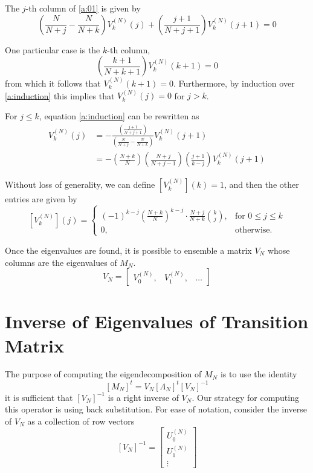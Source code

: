 \documentclass{article}
\newcommand{\ppar}[1]{\left( #1 \right)}
\newcommand{\spar}[1]{\left[ #1 \right]}
\begin{document}
The $j$-th column of \eqref{a:01} is given by
\begin{equation}
    \ppar{\frac{N}{N+j}-\frac{N}{N+k} } V_k^{(N)}(j) + \ppar{\frac{j+1}{N+j+1}}V_k^{(N)}(j+1) = 0
    \label{a:induction}
\end{equation}

One particular case is the $k$-th column,
\begin{equation}
    \ppar{\frac{k+1}{N+k+1}}V_k^{(N)}(k+1) = 0
\end{equation}
from which it follows that $V_k^{(N)}(k+1) = 0$. Furthermore, by induction over \eqref{a:induction} this implies that $V_k^{(N)}(j) = 0$ for $j>k$.

For $j\leq k$, equation \eqref{a:induction} can be rewritten as
\begin{align}
    V_k^{(N)}(j) 
    &= -
    \frac{\ppar{\frac{j+1}{N+j+1}}}{\ppar{\frac{N}{N+j}-\frac{N}{N+k} }}
    V_k^{(N)}(j+1)
    \nonumber \\
    &=
    -
    \ppar{\frac{N+k}{N}} \ppar{\frac{N+j}{N+j-1}} \ppar{\frac{j+1}{k-j}} V_k^{(N)}(j+1)
\end{align}

Without loss of generality, we can define $\spar{V_k^{(N)}}(k) = 1$, and then the other entries are given by
\begin{equation}
    \spar{V_k^{(N)}}(j) =
    \begin{cases}
    (-1)^{k-j} \ppar{\frac{N+k}{N}}^{k-j} \cdot \frac{N+j}{N+k} \binom{k}{j},
    &\text{for } 0 \leq j\leq k\\
    0, &\text{otherwise.}
    \end{cases}
\end{equation}

Once the eigenvalues are found, it is possible to ensemble a matrix $V_N$ whose columns are the eigenvalues of $M_N$.
\begin{equation}
    V_N = \begin{bmatrix}
        V_0^{(N)}, & V_1^{(N)}, & \dots
    \end{bmatrix}
\end{equation}

\section{Inverse of Eigenvalues of Transition Matrix}
\label{ap:inverse}

The purpose of computing the eigendecomposition of $M_N$ is to use the identity
\begin{equation}
    \spar{M_N}^t = V_N \spar{\Lambda_N}^t \spar{V_N}^{-1}
\end{equation}
it is sufficient that $\spar{V_N}^{-1}$ is a right inverse of $V_N$. 
%
Our strategy for computing this operator is using back substitution.
%
For ease of notation, consider the inverse of $V_N$ as a collection of row vectors
\begin{equation}
    \spar{V_N}^{-1} = \begin{bmatrix}
        U_0^{(N)} \\ U_1^{(N)} \\ \vdots
    \end{bmatrix}
\end{equation} 
\end{document}

